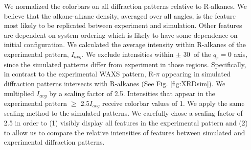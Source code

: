 \documentclass{article}
\newcommand{\angstrom}{\textup{\AA}}
\begin{document}
  We normalized the colorbars on all diffraction patterns relative to
  R-alkanes. We believe that the alkane-alkane density, averaged over all angles,
  is the feature most likely to be replicated between experiment and simulation.
  Other features are dependent on system ordering which is likely to have some
  dependence on initial configuration. We calculated the average intensity within
  R-alkanes of the experimental pattern, $I_{avg}$.  We exclude intensities
  within $\pm$ 30\degree~of the $q_r=0$ axis, since the simulated patterns differ
  from experiment in those regions.  Specifically, in contrast to the
  experimental WAXS pattern, R-$\pi$ appearing in simulated diffraction patterns
  intersects with R-alkanes (See Fig. \ref{fig:XRDsim}). We multiplied $I_{avg}$
  by a scaling factor of 2.5. Intensities that appear in the experimental pattern
  $\geq$ 2.5$I_{avg}$ receive colorbar values of 1. We apply the same scaling
  method to the simulated patterns. We carefully chose a scaling factor of 2.5 in
  order to (1) visibly display all features in the experimental pattern and (2)
  to allow us to compare the relative intensities of features between simulated
  and experimental diffraction patterns.

  
\end{document}
